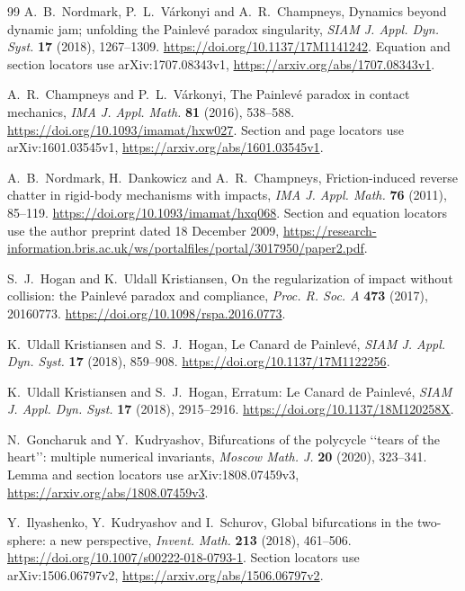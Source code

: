\begin{thebibliography}{99}
\small
\setlength{\itemsep}{1pt}
A.~B.~Nordmark, P.~L.~V\'arkonyi and A.~R.~Champneys,
\newblock Dynamics beyond dynamic jam; unfolding the Painlev\'e paradox singularity,
\newblock \emph{SIAM J. Appl. Dyn. Syst.} \textbf{17} (2018), 1267--1309.
\newblock \url{https://doi.org/10.1137/17M1141242}.
\newblock Equation and section locators use arXiv:1707.08343v1,
\url{https://arxiv.org/abs/1707.08343v1}.

A.~R.~Champneys and P.~L.~V\'arkonyi,
\newblock The Painlev\'e paradox in contact mechanics,
\newblock \emph{IMA J. Appl. Math.} \textbf{81} (2016), 538--588.
\newblock \url{https://doi.org/10.1093/imamat/hxw027}.
\newblock Section and page locators use arXiv:1601.03545v1,
\url{https://arxiv.org/abs/1601.03545v1}.

A.~B.~Nordmark, H.~Dankowicz and A.~R.~Champneys,
\newblock Friction-induced reverse chatter in rigid-body mechanisms with impacts,
\newblock \emph{IMA J. Appl. Math.} \textbf{76} (2011), 85--119.
\newblock \url{https://doi.org/10.1093/imamat/hxq068}.
\newblock Section and equation locators use the author preprint dated
18 December 2009,
\url{https://research-information.bris.ac.uk/ws/portalfiles/portal/3017950/paper2.pdf}.

S.~J.~Hogan and K.~Uldall Kristiansen,
\newblock On the regularization of impact without collision:
the Painlev\'e paradox and compliance,
\newblock \emph{Proc. R. Soc. A} \textbf{473} (2017), 20160773.
\newblock \url{https://doi.org/10.1098/rspa.2016.0773}.

K.~Uldall Kristiansen and S.~J.~Hogan,
\newblock Le Canard de Painlev\'e,
\newblock \emph{SIAM J. Appl. Dyn. Syst.} \textbf{17} (2018), 859--908.
\newblock \url{https://doi.org/10.1137/17M1122256}.

K.~Uldall Kristiansen and S.~J.~Hogan,
\newblock Erratum: Le Canard de Painlev\'e,
\newblock \emph{SIAM J. Appl. Dyn. Syst.} \textbf{17} (2018), 2915--2916.
\newblock \url{https://doi.org/10.1137/18M120258X}.

N.~Goncharuk and Y.~Kudryashov,
\newblock Bifurcations of the polycycle \lq\lq tears of the heart\rq\rq:
multiple numerical invariants,
\newblock \emph{Moscow Math. J.} \textbf{20} (2020), 323--341.
\newblock Lemma and section locators use arXiv:1808.07459v3,
\url{https://arxiv.org/abs/1808.07459v3}.

Y.~Ilyashenko, Y.~Kudryashov and I.~Schurov,
\newblock Global bifurcations in the two-sphere: a new perspective,
\newblock \emph{Invent. Math.} \textbf{213} (2018), 461--506.
\newblock \url{https://doi.org/10.1007/s00222-018-0793-1}.
\newblock Section locators use arXiv:1506.06797v2,
\url{https://arxiv.org/abs/1506.06797v2}.


\end{thebibliography}
